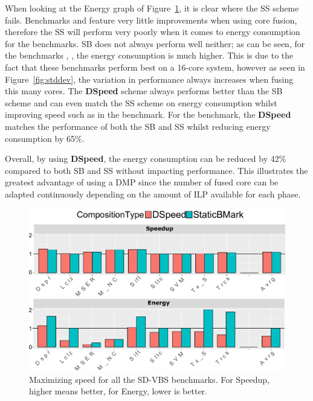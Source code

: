When looking at the Energy graph of Figure~\ref{fig:speedres}, it is clear where the SS scheme fails.
Benchmarks  and  feature very little improvements when using core fusion, therefore the SS will perform very poorly when it comes to energy consumption for the benchmarks.
SB does not always perform well neither; as can be seen, for the benchmarks , ,  the energy consumption is much higher.
This is due to the fact that these benchmarks perform best on a 16-core system, however as seen in Figure~\ref{fig:stddev}, the variation in performance always increases when fusing this many cores.
The \textbf{DSpeed} scheme always performs better than the SB scheme and can even match the SS scheme on energy consumption whilst improving speed such as in the  benchmark.
For the  benchmark, the \textbf{DSpeed} matches the performance of both the SB and SS whilst reducing energy consumption by 65\%.

Overall, by using \textbf{DSpeed}, the energy consumption can be reduced by 42\% compared to both SB and SS without impacting performance.
This illustrates the greatest advantage of using a DMP since the number of fused core can be adapted continuously depending on the amount of ILP available for each phase.

\begin{figure}
    \centering
	\includegraphics[width=1\textwidth]{cases-paper/graphics/results/speed_bars2.pdf}
    \caption{Maximizing speed for all the SD-VBS benchmarks. For Speedup, higher means better, for Energy, lower is better.}
    \label{fig:speedres}
	\vspace{5mm}
\end{figure}
%

